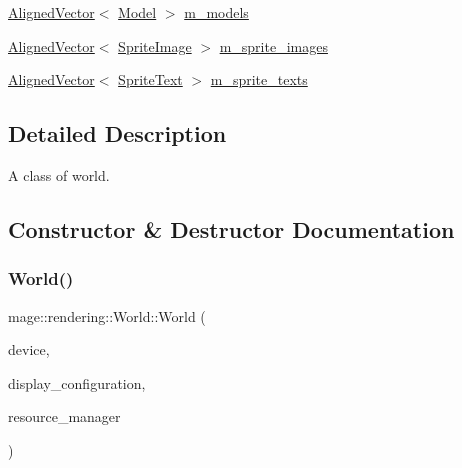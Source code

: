 \begin{DoxyCompactItemize}
\item 
\hyperlink{namespacemage_a8664bfb5ce2179fc64eae9f82c8a5ba8}{Aligned\+Vector}$<$ \hyperlink{classmage_1_1rendering_1_1_model}{Model} $>$ \hyperlink{classmage_1_1rendering_1_1_world_aed32b3cd3f6d46c68493a48d42047c1f}{m\+\_\+models}
\item 
\hyperlink{namespacemage_a8664bfb5ce2179fc64eae9f82c8a5ba8}{Aligned\+Vector}$<$ \hyperlink{classmage_1_1rendering_1_1_sprite_image}{Sprite\+Image} $>$ \hyperlink{classmage_1_1rendering_1_1_world_ae407a779908a300c6c979fd0e11c1471}{m\+\_\+sprite\+\_\+images}
\item 
\hyperlink{namespacemage_a8664bfb5ce2179fc64eae9f82c8a5ba8}{Aligned\+Vector}$<$ \hyperlink{classmage_1_1rendering_1_1_sprite_text}{Sprite\+Text} $>$ \hyperlink{classmage_1_1rendering_1_1_world_a6d3d85a9a5d13e6ba74d56ace106a865}{m\+\_\+sprite\+\_\+texts}
\end{DoxyCompactItemize}


\subsection{Detailed Description}
A class of world. 

\subsection{Constructor \& Destructor Documentation}
\hypertarget{classmage_1_1rendering_1_1_world_af9fc38564ff93abc8c760ab15f1faffe}{}\label{classmage_1_1rendering_1_1_world_af9fc38564ff93abc8c760ab15f1faffe} 
\subsubsection{\texorpdfstring{World()}{World()}\hspace{0.1cm}{\footnotesize\ttfamily [1/3]}}
{\footnotesize\ttfamily mage\+::rendering\+::\+World\+::\+World (\begin{DoxyParamCaption}\item[{I\+D3\+D11\+Device \&}]{device,  }\item[{\hyperlink{classmage_1_1rendering_1_1_display_configuration}{Display\+Configuration} \&}]{display\+\_\+configuration,  }\item[{\hyperlink{classmage_1_1rendering_1_1_resource_manager}{Resource\+Manager} \&}]{resource\+\_\+manager }\end{DoxyParamCaption})\hspace{0.3cm}{\ttfamily [explicit]}}

